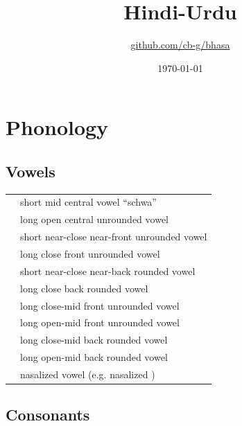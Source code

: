 \documentclass[12pt]{article}
\title{Hindi-Urdu\\\ipa{["HIndi: "URdu:]}}
\author{\href{https://github.com/cb-g/bhasa}{github.com/cb-g/bhasa}}
\date{\today}
\begin{document}
\pagecolor{custom_bg}\color{custom_fg}
\maketitle\thispagestyle{empty}

\newpage\setcounter{page}{1}\section{Phonology}

\subsection{Vowels}

\begin{xltabular}{\textwidth}{lL}
   & short mid central vowel ``schwa'' \\
   & long open central unrounded vowel \\
   & short near-close near-front unrounded vowel \\
   & long close front unrounded vowel \\
   & short near-close near-back rounded vowel \\
   & long close back rounded vowel \\
   & long close-mid front unrounded vowel \\
   & long open-mid front unrounded vowel \\
   & long close-mid back rounded vowel \\
   & long open-mid back rounded vowel \\
   & nasalized vowel (e.g. nasalized ) \\
\end{xltabular}

\subsection{Consonants}
\end{document}
